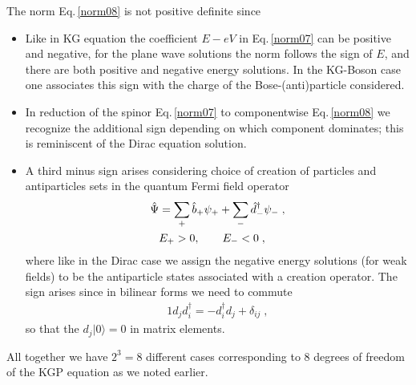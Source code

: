 \documentclass[epj]{svjour}
\begin{document}
The norm Eq.\,\eqref{norm08} is not positive definite since
\begin{itemize}
\item 
Like in KG equation the coefficient $E-eV$ in Eq.\,\eqref{norm07} can be positive and negative, for the plane wave solutions the norm follows the sign of $E$, and there are both positive and negative energy solutions. In the KG-Boson case one associates this sign with the charge of the Bose-(anti)particle considered.
%
\item 
In reduction of the spinor Eq.\,\eqref{norm07} to componentwise Eq.\,\eqref{norm08} we recognize the additional sign depending on which component dominates; this is reminiscent of the Dirac equation solution.
%
\item
A third minus sign arises considering choice of creation of particles and antiparticles sets in the quantum Fermi field operator 
\begin{alignat}{1}
\label{norm07QuantumKGP1} 
\hat \Psi&=\sum_+\hat b_+ \psi_++\sum_-\hat d_-^\dagger \psi_-\;,\\ \notag
 &E_+>0, \qquad E_-<0\;,
\end{alignat}
where like in the Dirac case we assign the negative energy solutions (for weak fields) to be the antiparticle states associated with a creation operator. The sign arises since in bilinear forms we need to commute
\begin{alignat}{1}
\label{norm07QuantumKGP8} 
d_j d_i^\dagger =- d_i^\dagger d_j +\delta_{ij}\;,
\end{alignat}
so that the $d_j|0\rangle=0$ in matrix elements. 
\end{itemize}
All together we have $2^3=8$ different cases corresponding to 8 degrees of freedom of the KGP equation as we noted earlier.
\end{document}
